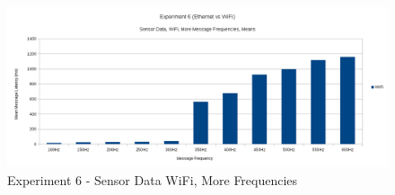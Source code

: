 \documentclass[../dissertation.tex]{subfiles}
\begin{document}
\begin{figure}[H]
\centering
\includegraphics[width=\textwidth]{images/experiment6/sensor_data_wifi_more_freqs_means.png}
\caption{Experiment 6 - Sensor Data WiFi, More Frequencies}
\label{exp6-sensor-wifi-more-freq-means}
\end{figure}
\end{document}
